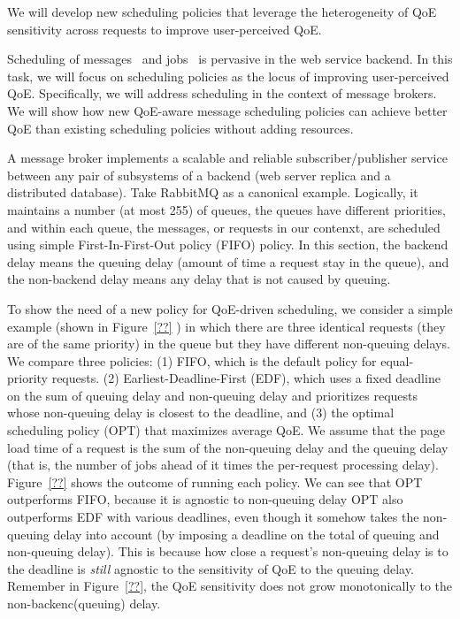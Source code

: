 \begin{task}
We will develop new scheduling policies that leverage the heterogeneity of QoE sensitivity across requests to improve user-perceived QoE.
\end{task}

Scheduling of messages~\cite{??} and jobs~\cite{??} is pervasive in the web service backend. 
In this task, we will focus on scheduling policies as the locus of improving user-perceived QoE.
Specifically, we will address scheduling in the context of message brokers.
We will show how new QoE-aware message scheduling policies can achieve better QoE than existing scheduling policies without adding resources.

A message broker implements a scalable and reliable subscriber/publisher service between any pair of subsystems of a backend (\eg web server replica and a distributed database). 
Take RabbitMQ as a canonical example. 
Logically, it maintains a number (at most 255) of queues, the queues have different priorities, and within each queue, the messages, or requests in our contenxt, are scheduled using simple First-In-First-Out policy (FIFO) policy.
In this section, the backend delay means the queuing delay (amount of time a request stay in the queue), and the non-backend delay means any delay that is not caused by queuing.

To show the need of a new policy for QoE-driven  scheduling, we consider a simple example (shown in Figure~\ref{??} ) in which there are three identical requests (\ie they are of the same priority) in the queue but they have different non-queuing delays.
We compare three policies: 
(1) FIFO, which is the default policy for equal-priority requests.
(2) Earliest-Deadline-First (EDF), which uses a fixed deadline on the sum of queuing delay and non-queuing delay and prioritizes requests whose non-queuing delay is closest to the deadline, and 
(3) the optimal scheduling policy (OPT) that maximizes average QoE.
We assume that the page load time of a request is the sum of the non-queuing delay and the queuing delay (that is, the number of jobs ahead of it times the per-request processing delay).
Figure~\ref{??}  shows the outcome of running each policy. 
We can see that OPT outperforms FIFO, because it is agnostic to non-queuing delay
OPT also outperforms EDF with various deadlines, even though it somehow takes the non-queuing delay into account (by imposing a deadline on the total of queuing and non-queuing delay).
This is because how close a request's non-queuing delay is to the deadline is {\em still} agnostic to the sensitivity of QoE to the queuing delay. 
Remember in Figure~\ref{??}, the QoE sensitivity does not grow monotonically to the non-backenc(queuing) delay. 

